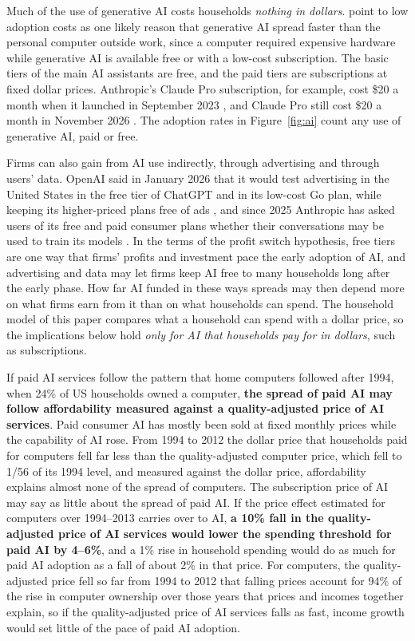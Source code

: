 \documentclass[11pt]{article}
\begin{document}
Much of the use of generative AI costs households \emph{nothing in dollars}. \citet{bick2024} point to low adoption costs as one likely reason that generative AI spread faster than the personal computer outside work, since a computer required expensive hardware while generative AI is available free or with a low-cost subscription. The basic tiers of the main AI assistants are free, and the paid tiers are subscriptions at fixed dollar prices. Anthropic's Claude Pro subscription, for example, cost \$20 a month when it launched in September 2023 \citep{anthropic2023}, and Claude Pro still cost \$20 a month in November 2026 \citep{anthropic2026}. The adoption rates in Figure~\ref{fig:ai} count any use of generative AI, paid or free.

Firms can also gain from AI use indirectly, through advertising and through users' data. OpenAI said in January 2026 that it would test advertising in the United States in the free tier of ChatGPT and in its low-cost Go plan, while keeping its higher-priced plans free of ads \citep{openai2026}, and since 2025 Anthropic has asked users of its free and paid consumer plans whether their conversations may be used to train its models \citep{anthropic2025}. In the terms of the profit switch hypothesis, free tiers are one way that firms' profits and investment pace the early adoption of AI, and advertising and data may let firms keep AI free to many households long after the early phase. How far AI funded in these ways spreads may then depend more on what firms earn from it than on what households can spend. The household model of this paper compares what a household can spend with a dollar price, so the implications below hold \emph{only for AI that households pay for in dollars}, such as subscriptions.

If paid AI services follow the pattern that home computers followed after 1994, when 24\% of US households owned a computer, \textbf{the spread of paid AI may follow affordability measured against a quality-adjusted price of AI services}. Paid consumer AI has mostly been sold at fixed monthly prices while the capability of AI rose. From 1994 to 2012 the dollar price that households paid for computers fell far less than the quality-adjusted computer price, which fell to 1/56 of its 1994 level, and measured against the dollar price, affordability explains almost none of the spread of computers. The subscription price of AI may say as little about the spread of paid AI. If the price effect estimated for computers over 1994--2013 carries over to AI, \textbf{a 10\% fall in the quality-adjusted price of AI services would lower the spending threshold for paid AI by 4--6\%}, and a 1\% rise in household spending would do as much for paid AI adoption as a fall of about 2\% in that price. For computers, the quality-adjusted price fell so far from 1994 to 2012 that falling prices account for 94\% of the rise in computer ownership over those years that prices and incomes together explain, so if the quality-adjusted price of AI services falls as fast, income growth would set little of the pace of paid AI adoption.
\end{document}
